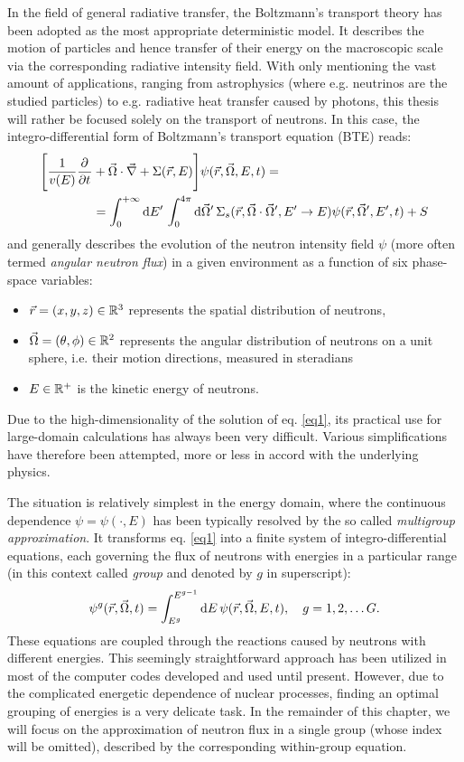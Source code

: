 In the field of general radiative transfer, the Boltzmann's transport theory has been adopted as the most appropriate deterministic model. It describes the motion of particles and hence transfer of their energy on the macroscopic scale via the corresponding radiative intensity field. With only mentioning the vast amount of applications, ranging from astrophysics (where e.g. neutrinos are the studied particles) to e.g. radiative heat transfer caused by photons, this thesis will rather be focused solely on the transport of neutrons. In this case, the integro-differential form of Boltzmann's transport equation (BTE) reads:
\begin{equation}\label{eq1}
  \begin{split}
    \Biggl[
      \frac{1}{v(E)} \pd{}{t} &+ \bomega\cdot\grad + \Sigma(\br,E)
    \Biggr]
    \psi(\br,\bomega,E,t) =\\
  & = \intE[']{0}{+\infty}{\intA[']{0}{4\pi}{\Sigma_s(\br,\bomega\cdot\bomega',E'\to E)\psi(\br,\bomega',E',t)}} + \S
  \end{split}  
\end{equation}
and generally describes the evolution of the neutron intensity field $\psi$ (more often termed \textit{angular neutron flux}) in a given environment as a function of six phase-space variables:
\begin{itemize}
 	\item $\br = (x,y,z) \in \R[3]$ represents the spatial distribution of neutrons,
 	\item $\bomega = (\theta, \phi) \in \R[2]$ represents the angular distribution of neutrons on a unit sphere, i.e. their motion directions, measured in steradians
 	\item $E\in \R[+]$ is the kinetic energy of neutrons.
\end{itemize} 
Due to the high-dimensionality of the solution of eq. \eqref{eq1}, its practical use for large-domain calculations has always been very difficult. Various simplifications have therefore been attempted, more or less in accord with the underlying physics. 

The situation is relatively simplest in the energy domain, where the continuous dependence $\psi = \psi(\cdot, E)$ has been typically resolved by the so called \textit{multigroup approximation}. It transforms eq. \eqref{eq1} into a finite system of integro-differential equations, each governing the flux of neutrons with energies in a particular range (in this context called \textit{group} and denoted by $g$ in superscript):
$$
  \psi^g(\br, \bomega, t) = \intEg{g}{g-1}{\psi(\br, \bomega, E, t)},\quad g = 1, 2,\ldots G.
$$
These equations are coupled through the reactions caused by neutrons with different energies. This seemingly straightforward approach has been utilized in most of the computer codes developed and used until present. However, due to the complicated energetic dependence of nuclear processes, finding an optimal grouping of energies is a very delicate task. In the remainder of this chapter, we will focus on the approximation of neutron flux in a single group (whose index will be omitted), described by the corresponding within-group equation.

